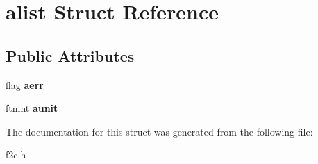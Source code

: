 \hypertarget{structalist}{
\section{alist Struct Reference}
\label{structalist}
}
\subsection*{Public Attributes}
\begin{DoxyCompactItemize}
\item 
\hypertarget{structalist_af470841413f5853794fa9830d1e71ecd}{
flag {\bfseries aerr}}
\label{structalist_af470841413f5853794fa9830d1e71ecd}

\item 
\hypertarget{structalist_a02749fb381f7642c1d5d01902817f673}{
ftnint {\bfseries aunit}}
\label{structalist_a02749fb381f7642c1d5d01902817f673}

\end{DoxyCompactItemize}


The documentation for this struct was generated from the following file:\begin{DoxyCompactItemize}
\item 
f2c.h\end{DoxyCompactItemize}
